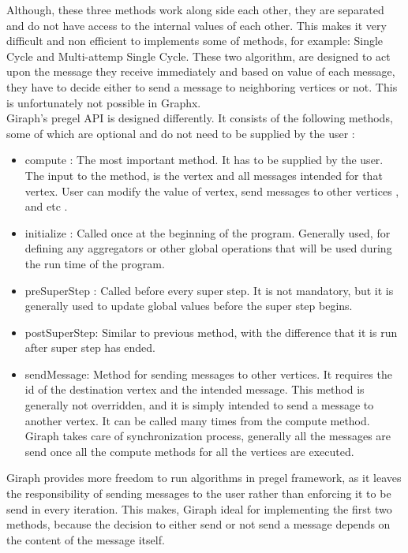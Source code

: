 \documentclass[english]{tktltiki}
\begin{document}
Although, these three methods work along side each other, they are separated and do not have access to the internal values of each other. This makes it very difficult and non efficient to implements some of methods, for example: Single Cycle and Multi-attemp Single Cycle. These two algorithm, are designed to act upon the message they receive immediately and based on value of each message, they have to decide either to send a message to neighboring vertices or not. This is unfortunately not possible in Graphx. \\
Giraph's pregel API is designed differently. It consists of the following methods, some of which are optional and do not need to be supplied by the user :
\begin{itemize}
\item compute : The most important method. It has to be supplied by the user. The input to the method, is the vertex and all messages intended for that vertex. User can modify the value of vertex, send messages to other vertices , and etc .
\item initialize : Called once at the beginning of the program. Generally used, for defining any aggregators or other global operations that will be used during the run time of the program.
\item preSuperStep : Called before every super step. It is not mandatory, but it is generally used to update global values before the super step begins.
\item postSuperStep: Similar to previous method, with the difference that it is run after super step has ended.
\item sendMessage: Method for sending messages to other vertices. It requires the id of the destination vertex and the intended message. This method is generally not overridden, and it is simply intended to send a message to another vertex. It can be called many times from the compute method. Giraph takes care of synchronization process, generally all the messages are send once all the compute methods for all the vertices are executed.
\end{itemize}

Giraph provides more freedom to run algorithms in pregel framework, as it leaves the responsibility of sending messages to the user rather than enforcing it to be send in every iteration. This makes, Giraph ideal for implementing the first two methods, because the decision to either send or not send a message depends on the content of the message itself.
\end{document}
